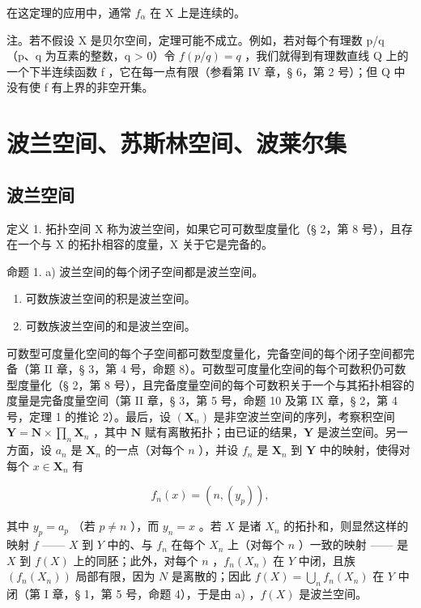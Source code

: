 在这定理的应用中，通常 \(f_{\alpha}\) 在 X 上是连续的。

注。若不假设 X 是贝尔空间，定理可能不成立。例如，若对每个有理数 p/q （p、q 为互素的整数，q \textgreater{} 0）令 \(f(p/q) = q\) ，我们就得到有理数直线 Q 上的一个下半连续函数 f ，它在每一点有限（参看第 IV 章，§ 6，第 2 号）；但 Q 中没有使 f 有上界的非空开集。

\section{波兰空间、苏斯林空间、波莱尔集}

\subsection{波兰空间}

定义 1. 拓扑空间 X 称为波兰空间，如果它可可数型度量化（§ 2，第 8 号），且存在一个与 X 的拓扑相容的度量，X 关于它是完备的。

命题 1. a) 波兰空间的每个闭子空间都是波兰空间。

\begin{enumerate}
\def\labelenumi{\alph{enumi})}
\setcounter{enumi}{1}
\item
  可数族波兰空间的积是波兰空间。
\item
  可数族波兰空间的和是波兰空间。
\end{enumerate}

可数型可度量化空间的每个子空间都可数型度量化，完备空间的每个闭子空间都完备（第 II 章，§ 3，第 4 号，命题 8）。可数型可度量化空间的每个可数积仍可数型度量化（§ 2，第 8 号），且完备度量空间的每个可数积关于一个与其拓扑相容的度量是完备度量空间（第 II 章，§ 3，第 5 号，命题 10 及第 IX 章，§ 2，第 4 号，定理 1 的推论 2）。最后，设 \((\mathbf{X}_n)\) 是非空波兰空间的序列，考察积空间 \(\mathbf{Y} = \mathbf{N} \times \prod_{n} \mathbf{X}_n\) ，其中 \(\mathbf{N}\) 赋有离散拓扑；由已证的结果，\(\mathbf{Y}\) 是波兰空间。另一方面，设 \(a_n\) 是 \(\mathbf{X}_n\) 的一点（对每个 \(n\) ），并设 \(f_n\) 是 \(\mathbf{X}_n\) 到 \(\mathbf{Y}\) 中的映射，使得对每个 \(x \in \mathbf{X}_n\) 有

\[
f _ {n} (x) = (n, \left(y _ {p}\right)),
\]

其中 \(y_{p} = a_{p}\) （若 \(p \neq n\) ），而 \(y_{n} = x\) 。若 \(X\) 是诸 \(X_{n}\) 的拓扑和，则显然这样的映射 \(f\) —— \(X\) 到 \(Y\) 中的、与 \(f_{n}\) 在每个 \(X_{n}\) 上（对每个 \(n\) ）一致的映射 —— 是 \(X\) 到 \(f(X)\) 上的同胚；此外，对每个 \(n\) ，\(f_{n}(X_{n})\) 在 \(Y\) 中闭，且族 \((f_{n}(X_{n}))\) 局部有限，因为 \(N\) 是离散的；因此 \(f(X) = \bigcup_{n} f_{n}(X_{n})\) 在 \(Y\) 中闭（第 I 章，§ 1，第 5 号，命题 4），于是由 a) ，\(f(X)\) 是波兰空间。

